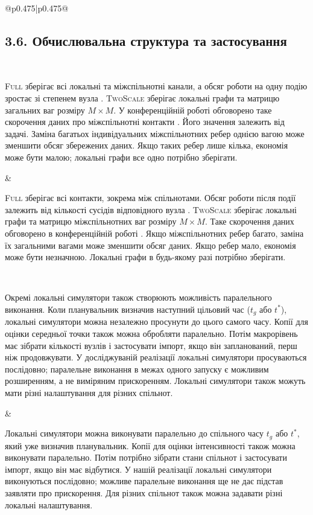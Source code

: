 ﻿\documentclass[11pt]{article}
\newcommand{\Full}{\textup{\textsc{Full}}}
\newcommand{\TS}{\textup{\textsc{TwoScale}}}
\begin{document}
\begin{longtable}{@{}p{0.475\textwidth}|p{0.475\textwidth}@{}}
\begin{minipage}[t]{\linewidth}
\subsection*{3.6. Обчислювальна структура та застосування}
\end{minipage} \\[5mm]
\begin{minipage}[t]{\linewidth}
\Full{} зберігає всі локальні та міжспільнотні канали, а обсяг роботи на одну подію зростає зі степенем вузла \citep{kuryliak2025simulating}. \TS{} зберігає локальні графи та матрицю загальних ваг розміру $M\times M$. У конференційній роботі обговорено таке скорочення даних про міжспільнотні контакти \citep{kuryliak2025towards}. Його значення залежить від задачі. Заміна багатьох індивідуальних міжспільнотних ребер однією вагою може зменшити обсяг збережених даних. Якщо таких ребер лише кілька, економія може бути малою; локальні графи все одно потрібно зберігати.
\end{minipage} &
\begin{minipage}[t]{\linewidth}
\Full{} зберігає всі контакти, зокрема між спільнотами. Обсяг роботи після події залежить від кількості сусідів відповідного вузла \citep{kuryliak2025simulating}. \TS{} зберігає локальні графи та матрицю міжспільнотних ваг розміру $M\times M$. Таке скорочення даних обговорено в конференційній роботі \citep{kuryliak2025towards}. Якщо міжспільнотних ребер багато, заміна їх загальними вагами може зменшити обсяг даних. Якщо ребер мало, економія може бути незначною. Локальні графи в будь-якому разі потрібно зберігати.
\end{minipage} \\[5mm]
\begin{minipage}[t]{\linewidth}
Окремі локальні симулятори також створюють можливість паралельного виконання. Коли планувальник визначив наступний цільовий час ($t_g$ або $t^\ast$), локальні симулятори можна незалежно просунути до цього самого часу. Копії для оцінки середньої точки також можна обробляти паралельно. Потім макрорівень має зібрати кількості вузлів і застосувати імпорт, якщо він запланований, перш ніж продовжувати. У досліджуваній реалізації локальні симулятори просуваються послідовно; паралельне виконання в межах одного запуску є можливим розширенням, а не виміряним прискоренням. Локальні симулятори також можуть мати різні налаштування для різних спільнот.
\end{minipage} &
\begin{minipage}[t]{\linewidth}
Локальні симулятори можна виконувати паралельно до спільного часу $t_g$ або $t^\ast$, який уже визначив планувальник. Копії для оцінки інтенсивності також можна виконувати паралельно. Потім потрібно зібрати стани спільнот і застосувати імпорт, якщо він має відбутися. У нашій реалізації локальні симулятори виконуються послідовно; можливе паралельне виконання ще не дає підстав заявляти про прискорення. Для різних спільнот також можна задавати різні локальні налаштування.

\end{minipage}
\end{longtable}
\end{document}
